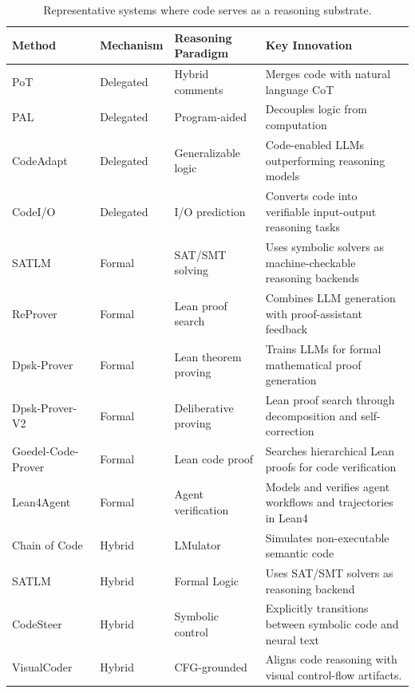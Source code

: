 \begin{table}[t]
\centering
\caption{
Representative systems where code serves as a reasoning substrate.
}
\renewcommand{\arraystretch}{1.15}
\setlength{\tabcolsep}{4pt}
\footnotesize
\begin{tabularx}{\textwidth}{p{2.8cm}p{2.2cm}p{3.1cm}X}
\toprule
\textbf{Method} & \textbf{Mechanism} & \textbf{Reasoning Paradigm} & \textbf{Key Innovation} \\
\midrule
PoT~\cite{chen2022program} & Delegated & Hybrid comments & Merges code with natural language CoT \\
PAL~\cite{gao2023pal} & Delegated & Program-aided & Decouples logic from computation \\
CodeAdapt~\cite{zhang2025code} & Delegated & Generalizable logic & Code-enabled LLMs outperforming reasoning models \\
CodeI/O~\cite{pmlr-v267-li25t} & Delegated & I/O prediction & Converts code into verifiable input-output reasoning tasks \\
SATLM~\cite{ye2023satlm} & Formal & SAT/SMT solving & Uses symbolic solvers as machine-checkable reasoning backends \\
ReProver~\cite{yang2023leandojo} & Formal & Lean proof search & Combines LLM generation with proof-assistant feedback \\
Dpsk-Prover~\cite{xin2025deepseek} & Formal & Lean theorem proving & Trains LLMs for formal mathematical proof generation \\
Dpsk-Prover-V2~\cite{ren2025deepseek2} & Formal & Deliberative proving & Lean proof search through decomposition and self-correction \\
Goedel-Code-Prover~\cite{li2026goedel} & Formal & Lean code proof & Searches hierarchical Lean proofs for code verification \\
Lean4Agent~\cite{wang2026lean4agent} & Formal & Agent verification & Models and verifies agent workflows and trajectories in Lean4 \\
Chain of Code~\cite{li2023chain} & Hybrid & LMulator & Simulates non-executable semantic code \\
SATLM~\cite{ye2023satlm} & Hybrid & Formal Logic & Uses SAT/SMT solvers as reasoning backend \\
CodeSteer~\cite{chen2025codesteer} & Hybrid & Symbolic control & Explicitly transitions between symbolic code and neural text \\
VisualCoder~\cite{chi-etal-2025-visualcoder} & Hybrid & CFG-grounded & Aligns code reasoning with visual control-flow artifacts. \\

\end{tabularx}
\end{table}
